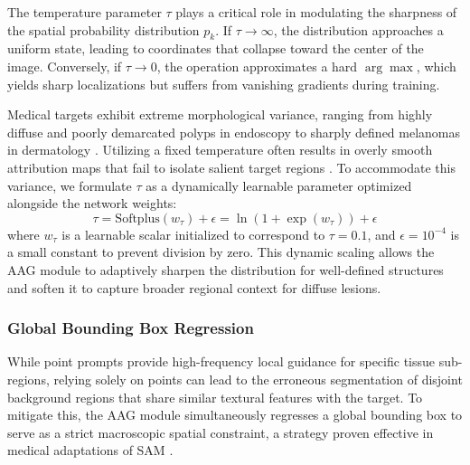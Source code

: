 \documentclass[onecolumn]{IEEEtran}
\numberwithin{equation}{section}
\theoremstyle{definition}
\theoremstyle{remark}
\begin{document}
The temperature parameter $\tau$ plays a critical role in modulating the sharpness of the spatial probability distribution $p_k$. If $\tau \to \infty$, the distribution approaches a uniform state, leading to coordinates that collapse toward the center of the image. Conversely, if $\tau \to 0$, the operation approximates a hard $\arg\max$, which yields sharp localizations but suffers from vanishing gradients during training.

Medical targets exhibit extreme morphological variance, ranging from highly diffuse and poorly demarcated polyps in endoscopy \cite{jha2020kvasir} to sharply defined melanomas in dermatology \cite{codella2018skin}. Utilizing a fixed temperature often results in overly smooth attribution maps that fail to isolate salient target regions \cite{wang2023visual}. To accommodate this variance, we formulate $\tau$ as a dynamically learnable parameter optimized alongside the network weights:
\begin{equation}
    \tau = \text{Softplus}(w_\tau) + \epsilon = \ln(1 + \exp(w_\tau)) + \epsilon
\end{equation}
where $w_\tau$ is a learnable scalar initialized to correspond to $\tau = 0.1$, and $\epsilon = 10^{-4}$ is a small constant to prevent division by zero. This dynamic scaling allows the AAG module to adaptively sharpen the distribution for well-defined structures and soften it to capture broader regional context for diffuse lesions.

\subsubsection{Global Bounding Box Regression}

While point prompts provide high-frequency local guidance for specific tissue sub-regions, relying solely on points can lead to the erroneous segmentation of disjoint background regions that share similar textural features with the target. To mitigate this, the AAG module simultaneously regresses a global bounding box to serve as a strict macroscopic spatial constraint, a strategy proven effective in medical adaptations of SAM \cite{dai2024samaug}.
\end{document}
